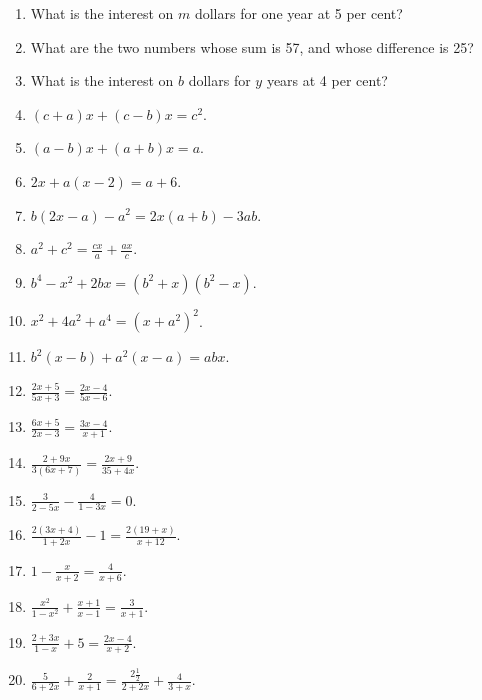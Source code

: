\documentclass{book}
\begin{document}
\begin{enumerate}
\item What is the interest on $m$ dollars for one year at 5 per
cent?

\item What are the two numbers whose sum is 57, and whose
difference is 25?

\item What is the interest on $b$ dollars for $y$ years at 4 per
cent?

\item $(c+a)x+(c-b)x = c^2$.

\item $(a-b)x+(a+b)x = a$.

\item $2x+a(x-2) = a+6$.

\item $b(2x-a)-a^2 = 2x(a+b)-3ab$.


\item $\displaystyle  a^2+c^2=\frac{cx}{a}+\frac{ax}{c}$.

\item $b^4-x^2+2bx=(b^2+x)(b^2-x)$.

\item $x^2+4a^2+a^4=\left(x+a^2\right)^2$.

\item $b^2(x-b)+a^2(x-a)=abx$.

\item $\displaystyle \frac{2x+5}{5x+3}=\frac{2x-4}{5x-6}$.

\item $\displaystyle \frac{6x+5}{2x-3}=\frac{3x-4}{x+1}$.

\item $\displaystyle \frac{2+9x}{3(6x+7)}=\frac{2x+9}{35+4x}$.

\item $\displaystyle \frac{3}{2-5x}-\frac{4}{1-3x}=0$.

\item $\displaystyle \frac{2(3x+4)}{1+2x}-1=\frac{2(19+x)}{x+12}$.

\item $\displaystyle 1-\frac{x}{x+2}=\frac{4}{x+6}$.

\item $\displaystyle
\frac{x^2}{1-x^2}+\frac{x+1}{x-1}=\frac{3}{x+1}$.

\item $\displaystyle \frac{2+3x}{1-x}+5=\frac{2x-4}{x+2}$.

\item $\displaystyle
\frac{5}{6+2x}+\frac{2}{x+1}=\frac{2\frac{1}{2}}{2+2x}+\frac{4}{3+x}$.


\end{enumerate}
\end{document}
